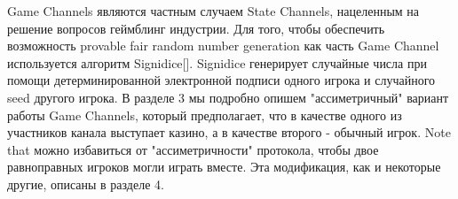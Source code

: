 	Game Channels являются частным случаем State Channels, нацеленным на решение вопросов геймблинг индустрии. Для того, чтобы обеспечить возможность provable fair random number generation как часть Game Channel используется алгоритм Signidice[]. Signidice генерирует случайные числа при помощи детерминированной электронной подписи одного игрока и случайного seed другого игрока. В разделе 3 мы подробно опишем "ассиметричный" вариант работы Game Channels, который предполагает, что в качестве одного из участников канала выступает казино, а в качестве второго - обычный игрок. Note that можно избавиться от "ассиметричности" протокола, чтобы двое равноправных игроков могли играть вместе. Эта модификация, как и некоторые другие, описаны в разделе 4.